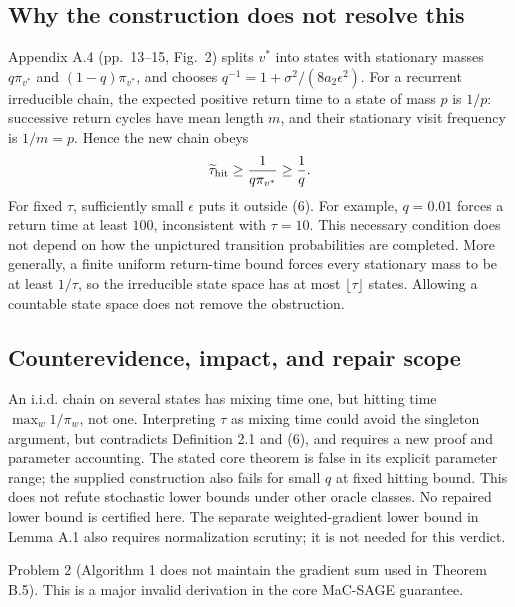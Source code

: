 \documentclass[10pt]{article}
\begin{document}
\subsection*{Why the construction does not resolve this}
Appendix A.4 (pp. 13–15, Fig. 2) splits \(v^*\) into states with stationary masses \(q\pi_{v^*}\) and \((1-q)\pi_{v^*}\), and chooses \(q^{-1}=1+\sigma^2/(8a_2\epsilon^2)\). For a recurrent irreducible chain, the expected positive return time to a state of mass \(p\) is \(1/p\): successive return cycles have mean length \(m\), and their stationary visit frequency is \(1/m=p\). Hence the new chain obeys \[\widetilde\tau_{\rm hit}\geq\frac{1}{q\pi_{v^*}}\geq\frac1q.\] For fixed \(\tau\), sufficiently small \(\epsilon\) puts it outside (6). For example, \(q=0.01\) forces a return time at least \(100\), inconsistent with \(\tau=10\). This necessary condition does not depend on how the unpictured transition probabilities are completed. More generally, a finite uniform return-time bound forces every stationary mass to be at least \(1/\tau\), so the irreducible state space has at most \(\lfloor\tau\rfloor\) states. Allowing a countable state space does not remove the obstruction.\par
\subsection*{Counterevidence, impact, and repair scope}
An i.i.d. chain on several states has mixing time one, but hitting time \(\max_w1/\pi_w\), not one. Interpreting \(\tau\) as mixing time could avoid the singleton argument, but contradicts Definition 2.1 and (6), and requires a new proof and parameter accounting. The stated core theorem is false in its explicit parameter range; the supplied construction also fails for small \(q\) at fixed hitting bound. This does not refute stochastic lower bounds under other oracle classes. No repaired lower bound is certified here. The separate weighted-gradient lower bound in Lemma A.1 also requires normalization scrutiny; it is not needed for this verdict.\par
Problem 2 (Algorithm 1 does not maintain the gradient sum used in Theorem B.5).  This is a major invalid derivation in the core MaC-SAGE guarantee.\par
\end{document}
